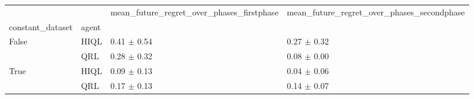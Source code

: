 \begin{tabular}{llll}
\toprule
 &  & mean_future_regret_over_phases_firstphase & mean_future_regret_over_phases_secondphase \\
constant_dataset & agent &  &  \\
\midrule
\multirow[t]{2}{*}{False} & HIQL & 0.41 $\pm$ 0.54 & 0.27 $\pm$ 0.32 \\
 & QRL & 0.28 $\pm$ 0.32 & 0.08 $\pm$ 0.00 \\
\cline{1-4}
\multirow[t]{2}{*}{True} & HIQL & 0.09 $\pm$ 0.13 & 0.04 $\pm$ 0.06 \\
 & QRL & 0.17 $\pm$ 0.13 & 0.14 $\pm$ 0.07 \\
\cline{1-4}
\bottomrule
\end{tabular}
